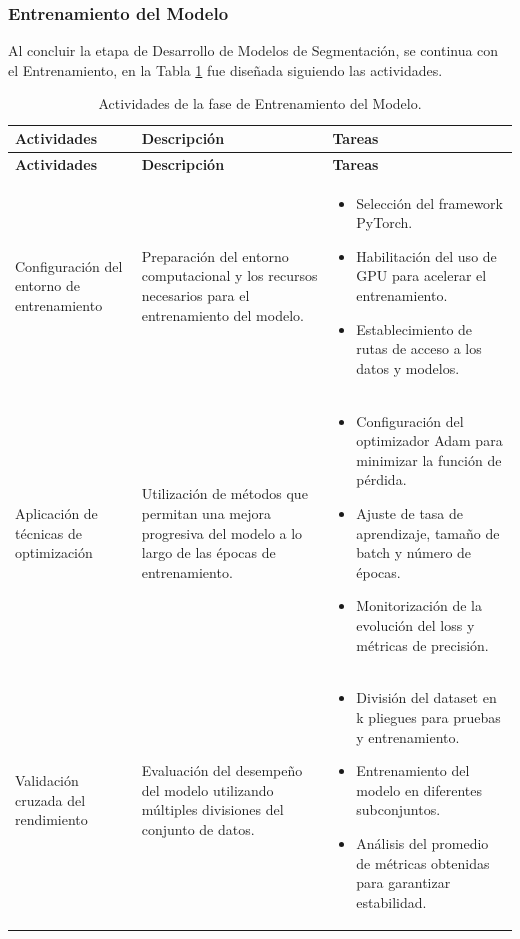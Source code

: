 \subsubsection{Entrenamiento del Modelo}
Al concluir la etapa de Desarrollo de Modelos de Segmentación, se continua con el Entrenamiento, en la Tabla \ref{tabla:entrenamiento_modelo} fue diseñada siguiendo las actividades.

\vspace{2ex}
 \begingroup
 \renewcommand\arraystretch{1.2}
 \begin{longtable}{p{4cm} p{6cm} p{6cm}}
 \caption{Actividades de la fase de Entrenamiento del Modelo.}
 \label{tabla:entrenamiento_modelo}\\
 \toprule
 \textbf{Actividades} & \textbf{Descripción} & \textbf{Tareas} \\
 \midrule
 \endfirsthead
 
 \toprule
 \textbf{Actividades} & \textbf{Descripción} & \textbf{Tareas} \\
 \midrule
 \endhead
 
 \bottomrule
 \endfoot
 
 Configuración del entorno de entrenamiento &
 Preparación del entorno computacional y los recursos necesarios para el entrenamiento del modelo. &
 \begin{itemize}
     \item Selección del framework PyTorch.
     \item Habilitación del uso de GPU para acelerar el entrenamiento.
     \item Establecimiento de rutas de acceso a los datos y modelos.
 \end{itemize} \\
 
 Aplicación de técnicas de optimización &
 Utilización de métodos que permitan una mejora progresiva del modelo a lo largo de las épocas de entrenamiento. &
 \begin{itemize}
     \item Configuración del optimizador Adam para minimizar la función de pérdida.
     \item Ajuste de tasa de aprendizaje, tamaño de batch y número de épocas.
     \item Monitorización de la evolución del loss y métricas de precisión.
 \end{itemize} \\
 
 Validación cruzada del rendimiento &
 Evaluación del desempeño del modelo utilizando múltiples divisiones del conjunto de datos. &
 \begin{itemize}
     \item División del dataset en k pliegues para pruebas y entrenamiento.
     \item Entrenamiento del modelo en diferentes subconjuntos.
     \item Análisis del promedio de métricas obtenidas para garantizar estabilidad.
 \end{itemize} \\
 
 \end{longtable}
 \endgroup

